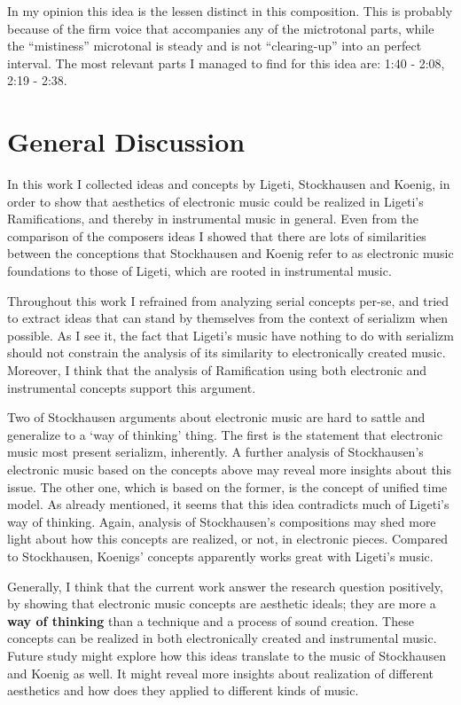 \documentclass[a4paper,11pt]{article}
\begin{document}
In my opinion this idea is the lessen distinct in this composition.
This is probably because of the firm voice that accompanies any of the mictrotonal parts, while the ``mistiness'' microtonal is steady and is not ``clearing-up'' into an perfect interval.
The most relevant parts I managed to find for this idea are: 1:40 - 2:08, 2:19 - 2:38.

\section{General Discussion}
\label{sec:general_discussion}

In this work I collected ideas and concepts by Ligeti, Stockhausen and Koenig, in order to show that aesthetics of electronic music could be realized in Ligeti's Ramifications, and thereby in instrumental music in general.
Even from the comparison of the composers ideas I showed that there are lots of similarities between the conceptions that Stockhausen and Koenig refer to as electronic music foundations to those of Ligeti, which are rooted in instrumental music.

Throughout this work I refrained from analyzing serial concepts per-se, and tried to extract ideas that can stand by themselves from the context of serializm when possible.
As I see it, the fact that Ligeti's music have nothing to do with serializm should not constrain the analysis of its similarity to electronically created music.
Moreover, I think that the analysis of Ramification using both electronic and instrumental concepts support this argument.

Two of Stockhausen arguments about electronic music are hard to sattle and generalize to a `way of thinking' thing.
The first is the statement that electronic music most present serializm, inherently.
A further analysis of Stockhausen's electronic music based on the concepts above may reveal more insights about this issue.
The other one, which is based on the former, is the concept of unified time model.
As already mentioned, it seems that this idea contradicts much of Ligeti's way of thinking.
Again, analysis of Stockhausen's compositions may shed more light about how this concepts are realized, or not, in electronic pieces.
Compared to Stockhausen, Koenigs' concepts apparently works great with Ligeti's music.

Generally, I think that the current work answer the research question positively, by showing that electronic music concepts are aesthetic ideals; they are more a \textbf{way of thinking} than a technique and a process of sound creation.
These concepts can be realized in both electronically created and instrumental music.
Future study might explore how this ideas translate to the music of Stockhausen and Koenig as well.
It might reveal more insights about realization of different aesthetics and how does they applied to different kinds of music.

\printbibliography[title={Bibliography}]
\end{document}
